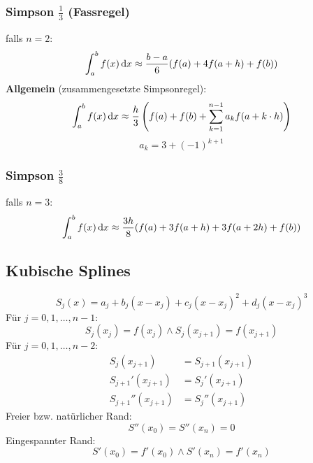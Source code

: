 \documentclass[german]{latex4ei/latex4ei_fs}
\begin{document}
\begin{sectionbox}
\subsubsection{Simpson $\frac{1}{3}$ (Fassregel)}
falls $n = 2$:
\begin{equation*}
	\int_a^b f(x) \diff x \approx \frac{b - a}{6} (f(a) + 4 f(a + h) + f(b))
\end{equation*}
\textbf{Allgemein} (zusammengesetzte Simpsonregel):
\begin{equation*}
	\int_a^b f(x) \diff x \approx \frac{h}{3} \left( f(a) + f(b) + \sum_{k = 1}^{n - 1} a_k f(a + k \cdot h) \right)
\end{equation*}
\begin{equation*}
	a_k = 3 + (-1)^{k + 1}
\end{equation*}

\subsubsection{Simpson $\frac{3}{8}$}
falls $n = 3$:
\begin{equation*}
	\int_a^b f(x) \diff x \approx \frac{3h}{8} (f(a) + 3 f(a + h) + 3 f(a + 2h) + f(b))
\end{equation*}
\end{sectionbox}

\begin{sectionbox}
\subsection{Kubische Splines}
\begin{equation*}
	S_j(x) = a_j + b_j (x-x_j) + c_j (x-x_j)^2 + d_j (x-x_j)^3
\end{equation*}
Für $j=0,1,\ldots,n-1$:
\begin{equation*}
	S_j(x_j) = f(x_j) \wedge S_j(x_{j+1}) = f(x_{j+1})
\end{equation*}
Für $j=0,1,\ldots,n-2$:
\begin{align*}
	S_j(x_{j+1}) &= S_{j+1}(x_{j+1})\\
	S_{j+1}'(x_{j+1}) &= S_j'(x_{j+1})\\
	S_{j+1}''(x_{j+1}) &= S_j''(x_{j+1})
\end{align*}
Freier bzw. natürlicher Rand:
\begin{equation*}
	S''(x_0) = S''(x_n) = 0
\end{equation*}
Eingespannter Rand:
\begin{equation*}
	S'(x_0) = f'(x_0) \wedge S'(x_n) = f'(x_n)
\end{equation*}
\end{sectionbox}
\end{document}
